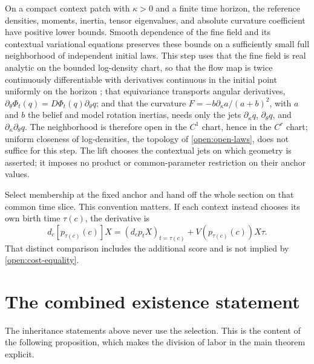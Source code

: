 On a compact context patch with $\kappa>0$ and a finite time horizon, the reference densities, moments, inertia, tensor eigenvalues, and absolute curvature coefficient have positive lower bounds. Smooth dependence of the fine field and its contextual variational equations preserves these bounds on a sufficiently small full neighborhood of independent initial laws. This step uses that the fine field is real analytic on the bounded log-density chart, so that the flow map is twice continuously differentiable with derivatives continuous in the initial point uniformly on the horizon \citep{Dieudonne1960}; that equivariance transports angular derivatives, $\partial_\theta\Phi_t(q)=D\Phi_t(q)\partial_\theta q$; and that the curvature $F=-b\partial_\kappa a/(a+b)^2$, with $a$ and $b$ the belief and model rotation inertias, needs only the jets $\partial_\kappa q$, $\partial_\theta q$, and $\partial_\kappa\partial_\theta q$. The neighborhood is therefore open in the $C^1$ chart, hence in the $C^r$ chart; uniform closeness of log-densities, the topology of \cref{open:open-laws}, does not suffice for this step. The lift chooses the contextual jets on which geometry is asserted; it imposes no product or common-parameter restriction on their anchor values.

Select membership at the fixed anchor and hand off the whole section on that common time slice. This convention matters. If each context instead chooses its own birth time $\tau(c)$, the derivative is
\begin{equation}
d_c[p_{\tau(c)}(c)]X
=(d_cp_tX)_{t=\tau(c)}+V(p_{\tau(c)}(c))X\tau.
\label{open:event-derivative}
\end{equation}
That distinct comparison includes the additional score and is not implied by \cref{open:cost-equality}.

\section{The combined existence statement}

The inheritance statements above never use the selection. This is the content of the following proposition, which makes the division of labor in the main theorem explicit.

